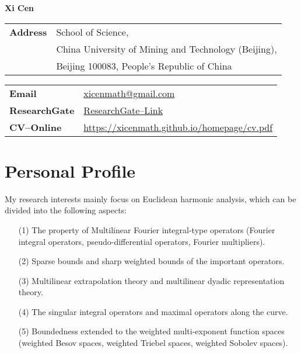 \documentclass{article}
\newcommand{\cvsection}[1]{\section*{\rmfamily#1}}
\begin{document}
\begin{center}
    \Large{
    \rmfamily
    \textbf{Xi Cen}}
\end{center}
\vspace{20pt}


\setlength{\parskip}{1pt}
\renewcommand{\arraystretch}{1.25}


\noindent
\begin{tabular}{@{}ll@{}}
\bf{Address}& School of Science,\\
& China University of Mining and
Technology (Beijing),\\
& Beijing 100083, People's Republic of China\\
\end{tabular}%
\hfill
\begin{tabular}{@{}ll@{}}
\bf{Email}& \href{mailto:xicenmath@gmail.com}{xicenmath@gmail.com}\\
\bf{ResearchGate}& \href{https://www.researchgate.net/profile/Xi-Cen-8?ev=prf_overview}{\color{blue}ResearchGate--Link}\\
\bf{CV--Online}& \href{https://xicenmath.github.io/homepage/cv.pdf}
{\color{blue} https://xicenmath.github.io/homepage/cv.pdf}
\end{tabular}
\vspace{2mm}

\setlength{\parskip}{3pt}


\cvsection{Personal Profile}
\indent
My research interests mainly focus on Euclidean harmonic analysis, which can be divided into the following aspects:
\begin{itemize}
\item[(1)] The property of Multilinear Fourier integral-type operators (Fourier integral operators, pseudo-differential operators, Fourier multipliers).
\item[(2)] Sparse bounds and sharp weighted bounds of the important operators.
\item[(3)] Multilinear extrapolation theory and multilinear dyadic representation theory.
\item[(4)] The singular integral operators and maximal operators along the curve.
\item[(5)] Boundedness extended to the weighted  multi-exponent function spaces (weighted Besov spaces, weighted Triebel spaces, weighted Sobolev spaces).
\end{itemize}
\end{document}
